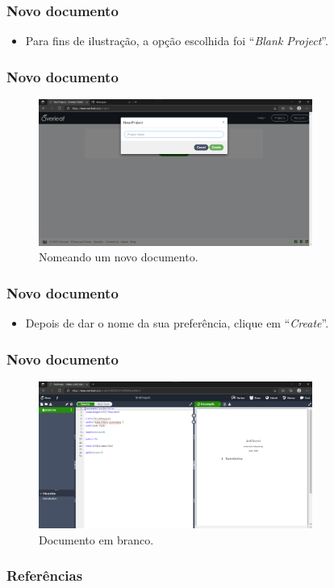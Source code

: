 \documentclass{beamer}
\begin{document}
    \begin{frame}
        \frametitle{Novo documento}
    \begin{itemize}
        \item Para fins de ilustração, a opção escolhida foi ``\textit{Blank Project}''.
    \end{itemize}
        
    
    \end{frame}

    \begin{frame}
        \frametitle{Novo documento}
        \begin{figure}
            \centering
            \caption{Nomeando um novo documento.}
            \label{fig:nameOfProject}
            \includegraphics[width=0.8\textwidth]{../images/nameOfProject.png}
        \end{figure}
    \end{frame}

    \begin{frame}
        \frametitle{Novo documento}
    \begin{itemize}
        \item Depois de dar o nome da sua preferência, clique em ``\textit{Create}''.
    \end{itemize}    
    \end{frame}

    \begin{frame}
        \frametitle{Novo documento}
        \begin{figure}
            \centering
            \caption{Documento em branco.}
            \label{fig:blankProject}
            \includegraphics[width=0.8\textwidth]{../images/blankProject.png}
        \end{figure}    
    \end{frame}

    \begin{frame}
        \frametitle{Referências}
        \nocite{*}
        \printbibliography[]{}
    \end{frame}
\end{document}
